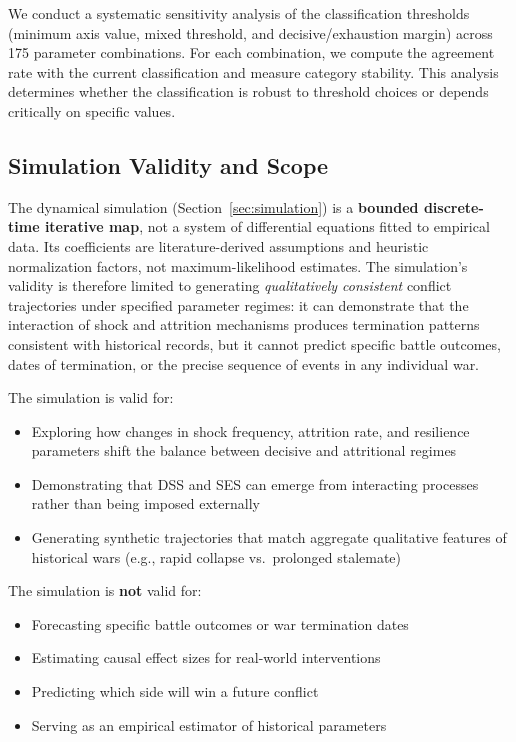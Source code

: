 We conduct a systematic sensitivity analysis of the classification thresholds (minimum axis value, mixed threshold, and decisive/exhaustion margin) across 175 parameter combinations. For each combination, we compute the agreement rate with the current classification and measure category stability. This analysis determines whether the classification is robust to threshold choices or depends critically on specific values.

\subsection{Simulation Validity and Scope}

The dynamical simulation (Section~\ref{sec:simulation}) is a \textbf{bounded discrete-time iterative map}, not a system of differential equations fitted to empirical data. Its coefficients are literature-derived assumptions and heuristic normalization factors, not maximum-likelihood estimates. The simulation's validity is therefore limited to generating \emph{qualitatively consistent} conflict trajectories under specified parameter regimes: it can demonstrate that the interaction of shock and attrition mechanisms produces termination patterns consistent with historical records, but it cannot predict specific battle outcomes, dates of termination, or the precise sequence of events in any individual war.

The simulation is valid for:
\begin{itemize}
    \item Exploring how changes in shock frequency, attrition rate, and resilience parameters shift the balance between decisive and attritional regimes
    \item Demonstrating that DSS and SES can emerge from interacting processes rather than being imposed externally
    \item Generating synthetic trajectories that match aggregate qualitative features of historical wars (e.g., rapid collapse vs.\ prolonged stalemate)
\end{itemize}

The simulation is \textbf{not} valid for:
\begin{itemize}
    \item Forecasting specific battle outcomes or war termination dates
    \item Estimating causal effect sizes for real-world interventions
    \item Predicting which side will win a future conflict
    \item Serving as an empirical estimator of historical parameters
\end{itemize}


